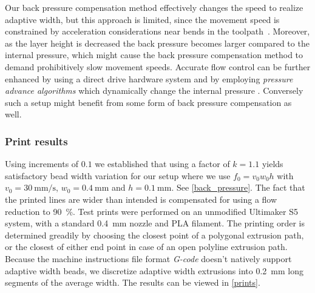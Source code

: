 {%
Our back pressure compensation method effectively changes the speed to realize adaptive width,
but this approach is limited, since the movement speed is constrained by acceleration considerations near bends in the toolpath~\cite{Ertay2018}.
Moreover, as the layer height is decreased the back pressure becomes larger compared to the internal pressure, which might cause the back pressure compensation method to demand prohibitively slow movement speeds.
%
Accurate flow control can be further enhanced by using a direct drive hardware system and by employing \emph{pressure advance algorithms} which dynamically change the internal pressure \cite{tronvoll2019investigating}.
Conversely such a setup might benefit from some form of back pressure compensation as well.

\subsubsection{Print results}
Using increments of $0.1$ we established that using a factor of $k=1.1$ yields satisfactory bead width variation for our setup where we use
$f_0 = v_0 w_0 h $
with
$v_0=\SI{30}{\milli\meter\per\second}$, 
$w_0=\SI{0.4}{\milli\meter}$
and
$h=\SI{0.1}{\milli\meter}$.
See \cref{back_pressure}.
The fact that the printed lines are wider than intended is compensated for using a flow reduction to \SI{90}{\percent}.
%
Test prints were performed on an unmodified Ultimaker S5 system,
with a standard  \SI{0.4}{\milli\meter} nozzle
and PLA filament.
The printing order is determined greadily by choosing the closest point of a polygonal extrusion path, or the closest of either end point in case of an open polyline extrusion path.
Because the machine instructions file format \emph{G-code} doesn't natively support adaptive width beads,
we discretize adaptive width extrusions into \SI{0.2}{\milli\meter} long segments of the average width.
The results can be viewed in \cref{prints}.


}
